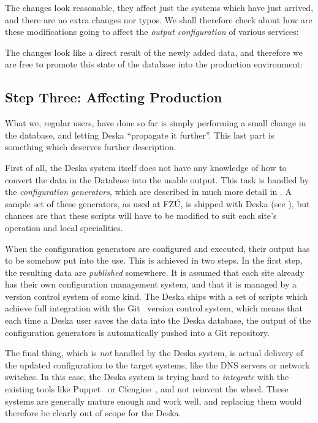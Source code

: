 \documentclass[deska]{subfiles}
\begin{document}

The changes look reasonable, they affect just the systems which have just arrived, and there are no extra changes nor
typos.  We shall therefore check about how are these modifications going to affect the {\em output configuration} of
various services:


The changes look like a direct result of the newly added data, and therefore we are free to promote this state of the
database into the production environment:


\subsection{Step Three: Affecting Production}

What we, regular users, have done so far is simply performing a small change in the database, and letting Deska
``propagate it further''.  This last part is something which deserves further description.

First of all, the Deska system itself does not have any knowledge of how to convert the data in the Database into the
usable output.  This task is handled by the {\em configuration generators}, which are described in much more detail in
.  A sample set of these generators, as used at FZÚ, is shipped with Deska (see
), but chances are that these scripts will have to be modified to suit each site's operation and
local specialities.

When the configuration generators are configured and executed, their output has to be somehow put into the use.  This is
achieved in two steps.  In the first step, the resulting data are {\em published} somewhere.  It is assumed that each
site already has their own configuration management system, and that it is managed by a version control system of some
kind.  The Deska ships with a set of scripts which achieve full integration with the Git~\cite{git} version control
system, which means that each time a Deska user saves the data into the Deska database, the output of the configuration
generators is automatically pushed into a Git repository.

The final thing, which is {\em not} handled by the Deska system, is actual delivery of the updated configuration to the
target systems, like the DNS servers or network switches.  In this case, the Deska system is trying hard to {\em
integrate} with the existing tools like Puppet~\cite{puppet} or Cfengine~\cite{cfengine}, and not reinvent the wheel.
These systems are generally mature enough and work well, and replacing them would therefore be clearly out of scope for
the Deska.
\end{document}
